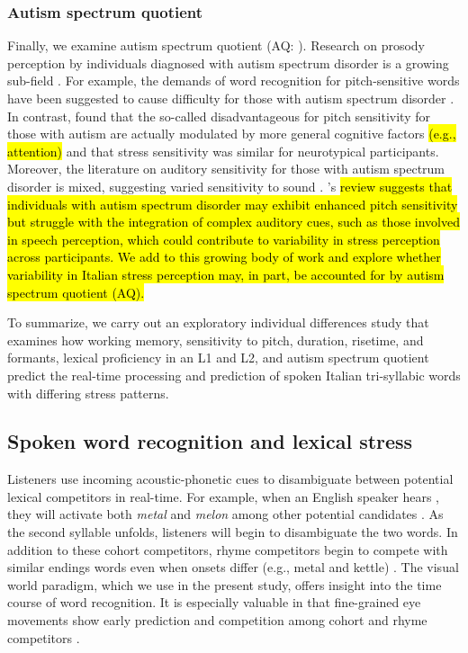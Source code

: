 \subsubsection{Autism spectrum quotient}
Finally, we examine autism spectrum quotient (AQ: \cite{Baron-Cohen2001}). Research on prosody perception by individuals diagnosed with autism spectrum disorder is a growing sub-field \citep[see ][]{Grice2023, Paul2005, McCann2003}. For example, the demands of word recognition for pitch-sensitive words have been suggested to cause difficulty for those with autism spectrum disorder \citep{schelinski2020speech}. In contrast, \cite{grossman2023relationship} found that the so-called disadvantageous for pitch sensitivity for those with autism are actually modulated by more general cognitive factors \hl{(e.g., attention)} and that stress sensitivity was similar for neurotypical participants. Moreover, the literature on auditory sensitivity for those with autism spectrum disorder is mixed, suggesting varied sensitivity to sound \citep{Kuiper2019, Stiegler2010}. \cite{haesen2011review}'s \hl{review suggests that individuals with autism spectrum disorder may exhibit enhanced pitch sensitivity but struggle with the integration of complex auditory cues, such as those involved in speech perception, which could contribute to variability in stress perception across participants. We add to this growing body of work and explore whether variability in Italian stress perception may, in part, be accounted for by autism spectrum quotient (AQ).}

To summarize, we carry out an exploratory individual differences study that examines how working memory, sensitivity to pitch, duration, risetime, and formants, lexical proficiency in an L1 and L2, and autism spectrum quotient predict the real-time processing and prediction of spoken Italian tri-syllabic words with differing stress patterns.

\subsection{Spoken word recognition and lexical stress}

Listeners use incoming acoustic-phonetic cues to disambiguate between potential lexical competitors in real-time. For example, when an English speaker hears , they will activate both \textit{metal} and \textit{melon} among other potential candidates \citep{Marslen1980}. As the second syllable unfolds, listeners will begin to disambiguate the two words. In addition to these cohort competitors, rhyme competitors begin to compete with similar endings words even when onsets differ (e.g., metal and kettle) \citep{Allopenna_1998}. The visual world paradigm, which we use in the present study, offers insight into the time course of word recognition. It is especially valuable in that fine-grained eye movements show early prediction and competition among cohort and rhyme competitors \citep{Allopenna_1998}.

